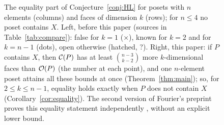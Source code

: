 \begin{figure}[htb]
\caption{The equality part of Conjecture~\ref{conj:HL} for posets with $n$ elements (columns) and faces of dimension $k$ (rows); for $n\leq4$ no poset contains $X$. Left, before this paper (sources in Table~\ref{tab:compare}): false for $k=1$ ($\times$), known for $k=2$ and for $k=n-1$ (dots), open otherwise (hatched, ?). Right, this paper: if $P$ contains $X$, then $\mathcal C(P)$ has at least $\binom{n-3}{k-2}$ more $k$-dimensional faces than $\mathcal O(P)$ (the number at each point), and one $n$-element poset attains all these bounds at once (Theorem~\ref{thm:main}); so, for $2\leq k\leq n-1$, equality holds exactly when $P$ does not contain $X$ (Corollary~\ref{cor:equality}). The second version of Fourier's preprint proves this equality statement independently \cite[Theorem~8.2]{FourierV2}, without an explicit lower bound.}\label{fig:beforeafter}
\end{figure}
